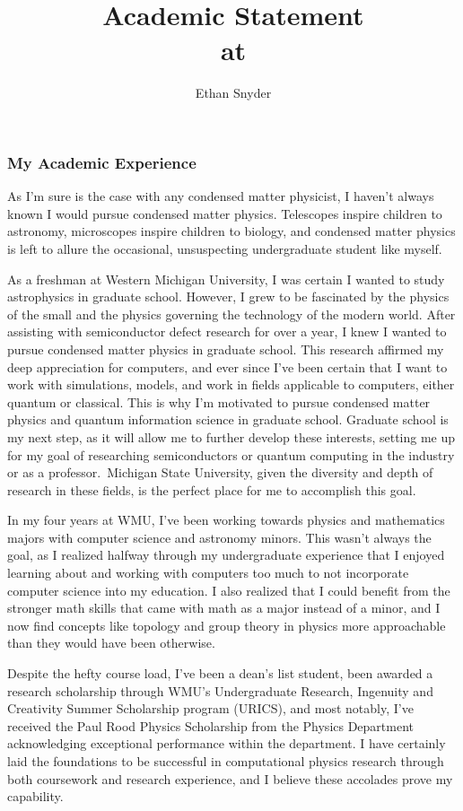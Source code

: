 \documentclass[11pt]{article}
\title{\vspace{-5em}Academic Statement\\
	\large \dept{} at \school{}}
\author{Ethan Snyder}
\date{}
\newcommand{\school}{Michigan State University}
\begin{document}
\maketitle
\subsubsection*{My Academic Experience}
As I'm sure is the case with any condensed matter physicist, I haven't always known I would pursue condensed matter physics. Telescopes inspire children to astronomy, microscopes inspire children to biology, and condensed matter physics is left to allure the occasional, unsuspecting undergraduate student like myself.

As a freshman at Western Michigan University, I was certain I wanted to study astrophysics in graduate school. However, I grew to be fascinated by the physics of the small and the physics governing the technology of the modern world. After assisting with semiconductor defect research for over a year, I knew I wanted to pursue condensed matter physics in graduate school. This research affirmed my deep appreciation for computers, and ever since I've been certain that I want to work with simulations, models, and work in fields applicable to computers, either quantum or classical. This is why I'm motivated to pursue condensed matter physics and quantum information science in graduate school. Graduate school is my next step, as it will allow me to further develop these interests, setting me up for my goal of researching semiconductors or quantum computing in the industry or as a professor.\ \school{}, given the diversity and depth of research in these fields, is the perfect place for me to accomplish this goal.

In my four years at WMU, I've been working towards physics and mathematics majors with computer science and astronomy minors. This wasn't always the goal, as I realized halfway through my undergraduate experience that I enjoyed learning about and working with computers too much to not incorporate computer science into my education. I also realized that I could benefit from the stronger math skills that came with math as a major instead of a minor, and I now find concepts like topology and group theory in physics more approachable than they would have been otherwise.

Despite the hefty course load, I've been a dean's list student, been awarded a research scholarship through WMU's Undergraduate Research, Ingenuity and Creativity Summer Scholarship program (URICS), and most notably, I've received the Paul Rood Physics Scholarship from the Physics Department acknowledging exceptional performance within the department. I have certainly laid the foundations to be successful in computational physics research through both coursework and research experience, and I believe these accolades prove my capability.
\end{document}
